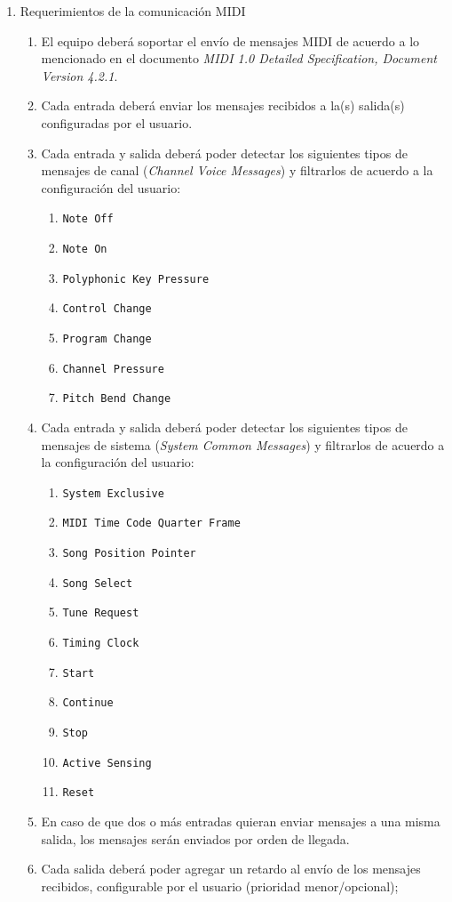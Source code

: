 \documentclass[
11pt, %
]{charter}
\begin{document}
\begin{enumerate}
	\item Requerimientos de la comunicación MIDI
	\begin{enumerate}
		\item El equipo deberá soportar el envío de mensajes MIDI de acuerdo a lo mencionado en el documento \emph{MIDI 1.0 Detailed Specification, Document Version 4.2.1}.
		\item Cada entrada deberá enviar los mensajes recibidos a la(s) salida(s) configuradas por el usuario.
		\item Cada entrada y salida deberá poder detectar los siguientes tipos de mensajes de canal (\emph{Channel Voice Messages}) y filtrarlos de acuerdo a la configuración del usuario:
		\begin{enumerate}
			\item \texttt{Note Off}
			\item \texttt{Note On}
			\item \texttt{Polyphonic Key Pressure}
			\item \texttt{Control Change}
			\item \texttt{Program Change}
			\item \texttt{Channel Pressure}
			\item \texttt{Pitch Bend Change}
		\end{enumerate}
		\item Cada entrada y salida deberá poder detectar los siguientes tipos de mensajes de sistema (\emph{System Common Messages}) y filtrarlos de acuerdo a la configuración del usuario:
		\begin{enumerate}
			\item \texttt{System Exclusive}
			\item \texttt{MIDI Time Code Quarter Frame}
			\item \texttt{Song Position Pointer}
			\item \texttt{Song Select}
			\item \texttt{Tune Request}
			\item \texttt{Timing Clock}
			\item \texttt{Start}
			\item \texttt{Continue}
			\item \texttt{Stop}
			\item \texttt{Active Sensing}
			\item \texttt{Reset}
		\end{enumerate}
		\item En caso de que dos o más entradas quieran enviar mensajes a una misma salida, los mensajes serán enviados por orden de llegada.
		\item Cada salida deberá poder agregar un retardo al envío de los mensajes recibidos, configurable por el usuario (prioridad menor/opcional);
	\end{enumerate}
	

\end{enumerate}
\end{document}
